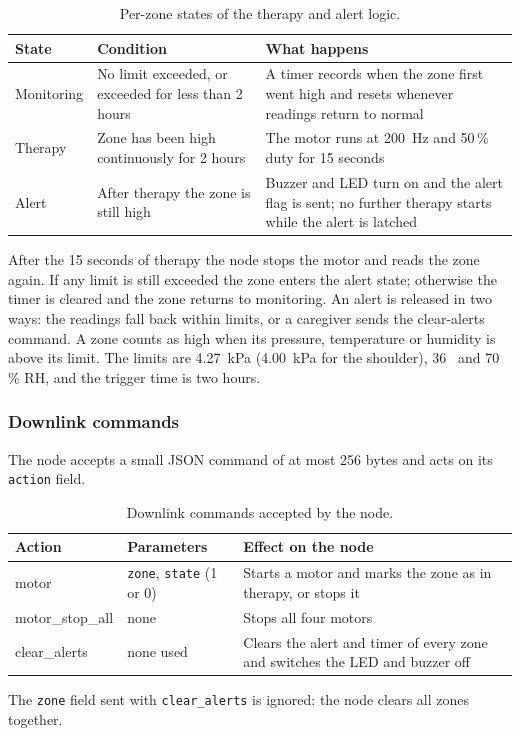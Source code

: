 {\small{}
\begin{table}[H]
\centering
\begin{tabularx}{\textwidth}{@{}>{\raggedright\arraybackslash}p{2.3cm}>{\raggedright\arraybackslash}p{4.6cm}X@{}}
\toprule
\textbf{State} & \textbf{Condition} & \textbf{What happens}\\
\midrule
Monitoring & No limit exceeded, or exceeded for less than 2 hours & A timer records when the zone first went high and resets whenever readings return to normal\\
Therapy & Zone has been high continuously for 2 hours & The motor runs at 200~Hz and 50\,\% duty for 15 seconds\\
Alert & After therapy the zone is still high & Buzzer and LED turn on and the alert flag is sent; no further therapy starts while the alert is latched\\
\bottomrule
\end{tabularx}
\caption{Per-zone states of the therapy and alert logic.}
\end{table}}
After the 15 seconds of therapy the node stops the motor and reads the zone again. If any limit is still exceeded the zone enters the alert state; otherwise the timer is cleared and the zone returns to monitoring. An alert is released in two ways: the readings fall back within limits, or a caregiver sends the clear-alerts command. A zone counts as high when its pressure, temperature or humidity is above its limit. The limits are 4.27~kPa (4.00~kPa for the shoulder), 36~\degC{} and 70\,\% RH, and the trigger time is two hours.

\subsubsection{Downlink commands}
The node accepts a small JSON command of at most 256 bytes and acts on its \texttt{action} field.

{\small{}
\begin{table}[H]
\centering
\begin{tabularx}{\textwidth}{@{}>{\ttfamily}p{3.2cm}>{\raggedright\arraybackslash}p{3.6cm}X@{}}
\toprule
\textbf{Action} & \textbf{Parameters} & \textbf{Effect on the node}\\
\midrule
motor & \texttt{zone}, \texttt{state} (1 or 0) & Starts a motor and marks the zone as in therapy, or stops it\\
motor\_stop\_all & none & Stops all four motors\\
clear\_alerts & none used & Clears the alert and timer of every zone and switches the LED and buzzer off\\
\bottomrule
\end{tabularx}
\caption{Downlink commands accepted by the node.}
\end{table}}
The \texttt{zone} field sent with \texttt{clear\_alerts} is ignored: the node clears all zones together.

